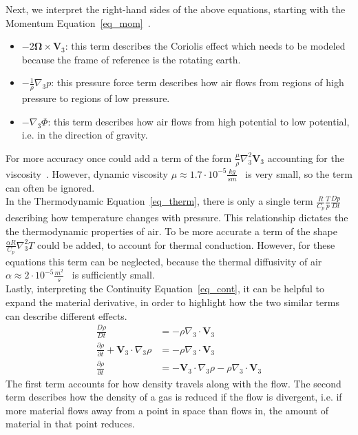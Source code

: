 \noindent
Next, we interpret the right-hand sides of the above equations, starting with the Momentum Equation~\ref{eq_mom}~\cite{coiffier2011fundamentals}.
\begin{itemize}
\item $-2\boldsymbol{\Omega}\times \textbf{V}_3$: this term describes the Coriolis effect which needs to be modeled because the frame of reference is the rotating earth.
\item $- \frac{1}{\rho}\nabla _3 p$: this pressure force term describes how air flows from regions of high pressure to regions of low pressure.
\item $- \nabla _3 \Phi$: this term describes how air flows from high  potential to low potential, i.e. in the direction of gravity.
\end{itemize}
For more accuracy once could add a term of the form $\frac{\mu}{\rho} \nabla _3^2 \textbf{V}_3$ accounting for the viscosity~\cite{cabralnsthermo}.
However, dynamic viscosity $\mu \approx 1.7\cdot 10^{-5}\frac{kg}{sm}$~\cite{cengel2010fluid} is very small, so the term can often be ignored.
\\

\noindent
In the Thermodynamic Equation~\ref{eq_therm}, there is only a single term $\frac{R}{C_p}\frac{T}{p}\frac{Dp}{Dt}$ describing how temperature changes with pressure.
This relationship dictates the the thermodynamic properties of air.%
To be more accurate a term of the shape $\frac{\alpha R}{C_p}\nabla _3^2 T$ could be added, to account for thermal conduction.
However, for these equations this term can be neglected, because the thermal diffusivity of air $\alpha \approx 2\cdot 10^{-5}\frac{m^2}{s}$~\cite{cengel2010fluid} is sufficiently small.
\\

\noindent
Lastly, interpreting the Continuity Equation~\ref{eq_cont}, it can be helpful to expand the material derivative, in order to highlight how the two similar terms can describe different effects.
\begin{align*}
\frac{D\rho}{Dt} &= -\rho \nabla _3 \cdot \textbf{V}_3\\
\frac{\partial \rho}{\partial t} + \textbf{V}_3 \cdot \nabla _3 \rho &= -\rho \nabla _3 \cdot \textbf{V}_3\\
\frac{\partial \rho}{\partial t} &=  - \textbf{V}_3 \cdot \nabla _3 \rho -\rho \nabla _3 \cdot \textbf{V}_3
\end{align*}
The first term accounts for how density travels along with the flow.
The second term describes how the density of a gas is reduced if the flow is divergent, i.e. if more material flows away from a point in space than flows in, the amount of material in that point reduces.
\\

